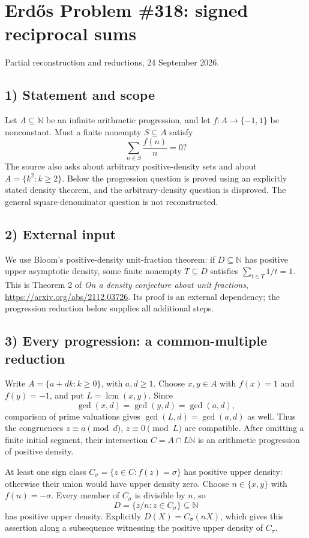 \section{Erd\H{o}s Problem \#318: signed reciprocal sums}
\noindent Partial reconstruction and reductions, 24 September 2026.

\subsection*{1) Statement and scope}
Let $A\subseteq\mathbb N$ be an infinite arithmetic progression, and let $f:A\to\{-1,1\}$ be nonconstant. Must a finite nonempty $S\subseteq A$ satisfy
\[\sum_{n\in S}\frac{f(n)}n=0?\]
The source also asks about arbitrary positive-density sets and about $A=\{k^2:k\ge2\}$. Below the progression question is proved using an explicitly stated density theorem, and the arbitrary-density question is disproved. The general square-denominator question is not reconstructed.

\subsection*{2) External input}
We use Bloom's positive-density unit-fraction theorem: if $D\subseteq\mathbb N$ has positive upper asymptotic density, some finite nonempty $T\subseteq D$ satisfies $\sum_{t\in T}1/t=1$. This is Theorem 2 of \emph{On a density conjecture about unit fractions}, \url{https://arxiv.org/abs/2112.03726}. Its proof is an external dependency; the progression reduction below supplies all additional steps.

\subsection*{3) Every progression: a common-multiple reduction}
Write $A=\{a+dk:k\ge0\}$, with $a,d\ge1$. Choose $x,y\in A$ with $f(x)=1$ and $f(y)=-1$, and put $L=\operatorname{lcm}(x,y)$. Since
\[\gcd(x,d)=\gcd(y,d)=\gcd(a,d),\]
comparison of prime valuations gives $\gcd(L,d)=\gcd(a,d)$ as well. Thus the congruences $z\equiv a\pmod d$, $z\equiv0\pmod L$ are compatible. After omitting a finite initial segment, their intersection $C=A\cap L\mathbb N$ is an arithmetic progression of positive density.

At least one sign class $C_\sigma=\{z\in C:f(z)=\sigma\}$ has positive upper density: otherwise their union would have upper density zero. Choose $n\in\{x,y\}$ with $f(n)=-\sigma$. Every member of $C_\sigma$ is divisible by $n$, so
\[D=\{z/n:z\in C_\sigma\}\subseteq\mathbb N\]
has positive upper density. Explicitly $D(X)=C_\sigma(nX)$, which gives this assertion along a subsequence witnessing the positive upper density of $C_\sigma$.

